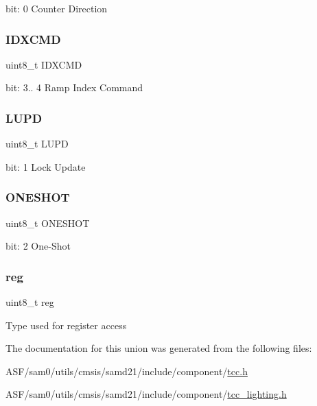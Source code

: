 bit\+: 0 Counter Direction \mbox{\label{union_t_c_c___c_t_r_l_b_s_e_t___type_abcff3047a0fc0306fbcbb7fac8c26b97}} 
\subsubsection{\texorpdfstring{IDXCMD}{IDXCMD}}
{\footnotesize\ttfamily uint8\+\_\+t I\+D\+X\+C\+MD}

bit\+: 3.. 4 Ramp Index Command \mbox{\label{union_t_c_c___c_t_r_l_b_s_e_t___type_a8ac44d571fac48acf217bb9425d04bdb}} 
\subsubsection{\texorpdfstring{LUPD}{LUPD}}
{\footnotesize\ttfamily uint8\+\_\+t L\+U\+PD}

bit\+: 1 Lock Update \mbox{\label{union_t_c_c___c_t_r_l_b_s_e_t___type_a7b9c94dc8f69244e81941bd1c96ca561}} 
\subsubsection{\texorpdfstring{ONESHOT}{ONESHOT}}
{\footnotesize\ttfamily uint8\+\_\+t O\+N\+E\+S\+H\+OT}

bit\+: 2 One-\/\+Shot \mbox{\label{union_t_c_c___c_t_r_l_b_s_e_t___type_a9428adc9af4653a2050e2536b55dec8d}} 
\subsubsection{\texorpdfstring{reg}{reg}}
{\footnotesize\ttfamily uint8\+\_\+t reg}

Type used for register access 

The documentation for this union was generated from the following files\+:\begin{DoxyCompactItemize}
\item 
A\+S\+F/sam0/utils/cmsis/samd21/include/component/\mbox{\hyperlink{tcc_8h}{tcc.\+h}}\item 
A\+S\+F/sam0/utils/cmsis/samd21/include/component/\mbox{\hyperlink{tcc__lighting_8h}{tcc\+\_\+lighting.\+h}}\end{DoxyCompactItemize}
